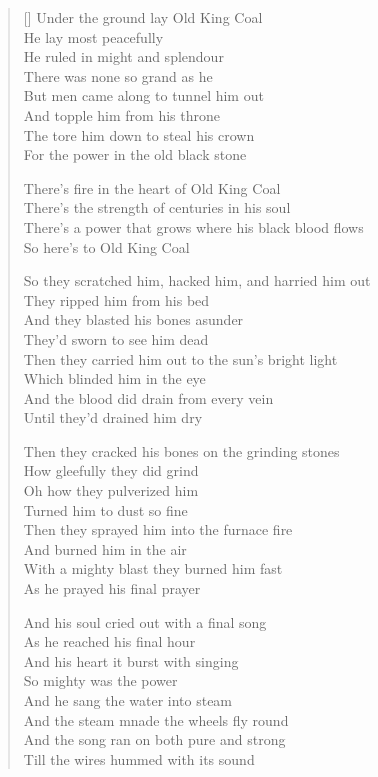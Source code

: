 \pagebreak
\settowidth{\versewidth}{There's a power that grows where his black blood flows}
\begin{verse}[\versewidth]
Under the ground lay Old King Coal\\
He lay most peacefully\\
He ruled in might and splendour\\
There was none so grand as he\\
But men came along to tunnel him out\\
And topple him from his throne\\
The tore him down to steal his crown\\
For the power in the old black stone

\begin{chorus}
There's fire in the heart of Old King Coal\\
There's the strength of centuries in his soul\\
There's a power that grows where his black blood flows\\
So here's to Old King Coal
\end{chorus}

So they scratched him, hacked him, and harried him out\\
They ripped him from his bed\\
And they blasted his bones asunder\\
They'd sworn to see him dead\\
Then they carried him out to the sun's bright light\\
Which blinded him in the eye\\
And the blood did drain from every vein\\
Until they'd drained him dry

Then they cracked his bones on the grinding stones\\
How gleefully they did grind\\
Oh how they pulverized him\\
Turned him to dust so fine\\
Then they sprayed him into the furnace fire\\
And burned him in the air\\
With a mighty blast they burned him fast\\
As he prayed his final prayer


And his soul cried out with a final song\\
As he reached his final hour\\
And his heart it burst with singing\\
So mighty was the power\\
And he sang the water into steam\\
And the steam mnade the wheels fly round\\
And the song ran on both pure and strong\\
Till the wires hummed with its sound


\end{verse}
